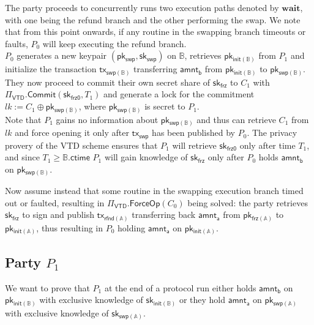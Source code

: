 \documentclass{article}      	%
\begin{document}
The party proceeds to concurrently runs two execution paths denoted by $\textbf{wait}$, with one being the refund branch and the other performing the swap. We note that from this point onwards, if any routine in the swapping branch timeouts or faults, $P_0$ will keep executing the refund branch. \\
$P_0$ generates a new keypair $(\mathsf{pk_{swp}}, \mathsf{sk_{swp}})$ on $\mathbb{B}$, retrieves $\mathsf{pk_{init(\mathbb{B})}}$ from $P_1$ and  initialize the transaction $\mathsf{tx_{swp(\mathbb{B})}}$ transferring $\mathsf{amnt_b}$ from $\mathsf{pk_{init(\mathbb{B})}}$ to $\mathsf{pk_{swp(\mathbb{B})}}$.
They now proceed to commit their own secret share of $\mathsf{sk_{frz}}$ to $C_1$ with $\Pi_\mathsf{VTD}.\mathsf{Commit}(\mathsf{sk_{frz0}}, T_1)$ and generate a lock for the commitment $lk := C_1 \oplus \mathsf{pk_{swp(\mathbb{B})}}$, where $\mathsf{pk_{swp(\mathbb{B})}}$ is secret to $P_1$. \\
Note that $P_1$ gains no information about $\mathsf{pk_{swp(\mathbb{B})}}$ and thus can retrieve $C_1$ from $lk$ and force opening it only after $\mathsf{tx_{swp}}$ has been published by $P_0$. The privacy provery of the VTD scheme ensures that $P_1$ will retrieve $\mathsf{sk_{frz0}}$ only after time $T_1$, and since $T_1 \geq \mathbb{B}.\mathsf{ctime}$ $P_1$ will gain knowledge of $\mathsf{sk_{frz}}$ only after $P_0$ holds $\mathsf{amnt_b}$ on $\mathsf{pk_{swp(\mathbb{B})}}$.

Now assume instead that some routine in the swapping execution branch timed out or faulted, resulting in $\Pi_{\mathsf{VTD}}.\mathsf{ForceOp}(C_0)$ being solved: the party retrieves $\mathsf{sk_{frz}}$ to sign and publish $\mathsf{tx_{rfnd(\mathbb{A})}}$ transferring back $\mathsf{amnt_a}$ from $\mathsf{pk_{frz(\mathbb{A})}}$ to $\mathsf{pk_{init(\mathbb{A})}}$, thus resulting in $P_0$ holding $\mathsf{amnt_a}$ on $\mathsf{pk_{init(\mathbb{A})}}$.


\subsection{Party $P_1$}
We want to prove that $P_1$ at the end of a protocol run either holds $\mathsf{amnt_b}$ on $\mathsf{pk_{init(\mathbb{B})}}$ with exclusive knowledge of $\mathsf{sk_{init(\mathbb{B})}}$ or they hold $\mathsf{amnt_a}$ on $\mathsf{pk_{swp(\mathbb{A})}}$ with exclusive knowledge of $\mathsf{sk_{swp(\mathbb{A})}}$. \\
\end{document}
